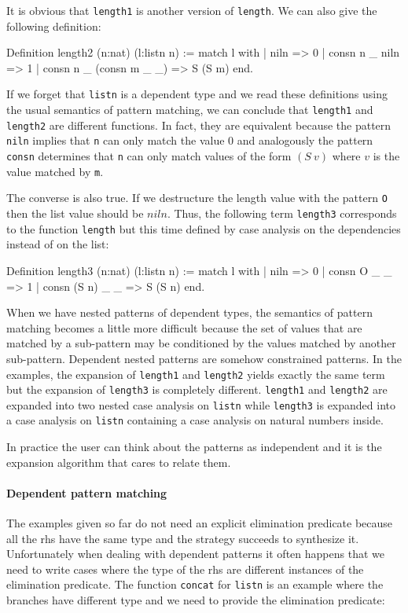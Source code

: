 It is obvious that \texttt{length1} is  another version of
\texttt{length}. We can also give the following definition:
\begin{coq_example}
Definition length2 (n:nat) (l:listn n) :=
  match l with
  | niln => 0
  | consn n _ niln => 1
  | consn n _ (consn m _ _) => S (S m)
  end.
\end{coq_example}

If we forget that \texttt{listn} is a dependent type and we read these
definitions using the usual semantics of pattern matching,  we can conclude
that \texttt{length1}
and \texttt{length2} are different functions.
In fact, they are equivalent
because the pattern \texttt{niln} implies that \texttt{n} can only match
the value $0$ and analogously the pattern \texttt{consn} determines that \texttt{n} can
only match  values of the form  $(S~v)$ where $v$ is the value matched by
\texttt{m}.

The converse is also true. If
we destructure the  length  value with the pattern \texttt{O} then the list
value should be $niln$.
Thus, the following term \texttt{length3} corresponds to the function
\texttt{length} but this time defined by case analysis on the dependencies instead of on the list:

\begin{coq_example}
Definition length3 (n:nat) (l:listn n) :=
  match l with
  | niln => 0
  | consn O _ _ => 1
  | consn (S n) _ _ => S (S n)
  end.
\end{coq_example}

When we have nested patterns of dependent types, the semantics of
pattern matching becomes a little more difficult because
the set of values that are matched by a sub-pattern may be conditioned by the
values matched by another sub-pattern. Dependent nested patterns are
somehow constrained patterns.
In the examples, the expansion of
\texttt{length1} and \texttt{length2} yields exactly the same term
 but the
expansion of \texttt{length3} is completely different. \texttt{length1} and
\texttt{length2} are expanded into two nested case analysis on
\texttt{listn} while \texttt{length3} is expanded into a case analysis on
\texttt{listn} containing a case analysis on natural numbers inside.


In practice the user can think about the patterns as independent and
it is the expansion algorithm that cares to relate them. \\
\fi
%
%
%

\paragraph{Dependent pattern matching}
The examples  given so far do not need an explicit elimination predicate
 because all the rhs have the same type and the
strategy succeeds to synthesize it.
Unfortunately when dealing with dependent patterns it often happens
that we need to write cases where the type of the rhs are
different  instances of the elimination  predicate.
The function  \texttt{concat} for \texttt{listn}
is an example where the branches have different type
and we need to provide the elimination predicate:

